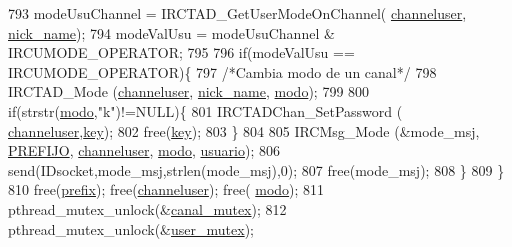 \begin{DoxyCode}
{{{{{{{{{{793                                 modeUsuChannel = IRCTAD\_GetUserModeOnChannel(
      \hyperlink{_g-2361-06-_p1-_server_8c_a55a7bd8f3229706c5917445aba995c5b}{channeluser}, \hyperlink{_g-2361-06-_p1-_server_8c_aabbf66718cda228b924a4a9441eadf62}{nick\_name});
794                                 modeValUsu = modeUsuChannel & IRCUMODE\_OPERATOR;
795 
796                                 \textcolor{keywordflow}{if}(modeValUsu == IRCUMODE\_OPERATOR)\{
797                                         \textcolor{comment}{/*Cambia modo de un canal*/}
798                                         IRCTAD\_Mode (\hyperlink{_g-2361-06-_p1-_server_8c_a55a7bd8f3229706c5917445aba995c5b}{channeluser}, 
      \hyperlink{_g-2361-06-_p1-_server_8c_aabbf66718cda228b924a4a9441eadf62}{nick\_name}, \hyperlink{_g-2361-06-_p1-_server_8c_a7451f0d59207b53af6178219fcf62677}{modo});
799 
800                                         \textcolor{keywordflow}{if}(strstr(\hyperlink{_g-2361-06-_p1-_server_8c_a7451f0d59207b53af6178219fcf62677}{modo},\textcolor{stringliteral}{"k"})!=NULL)\{
801                                                 IRCTADChan\_SetPassword (
      \hyperlink{_g-2361-06-_p1-_server_8c_a55a7bd8f3229706c5917445aba995c5b}{channeluser},\hyperlink{_g-2361-06-_p1-_server_8c_a5892a9181e6a332f84d27aecd41dcd12}{key});
802                                                 free(\hyperlink{_g-2361-06-_p1-_server_8c_a5892a9181e6a332f84d27aecd41dcd12}{key});
803                                         \}
804 
805                                         IRCMsg\_Mode (&mode\_msj, \hyperlink{_g-2361-06-_p1-_server_8h_a78c658ff923693099f7b621e7c351129}{PREFIJO}, 
      \hyperlink{_g-2361-06-_p1-_server_8c_a55a7bd8f3229706c5917445aba995c5b}{channeluser}, \hyperlink{_g-2361-06-_p1-_server_8c_a7451f0d59207b53af6178219fcf62677}{modo}, \hyperlink{_g-2361-06-_p1-_server_8c_a0147a5b81499984f9cb00379a8cb84af}{usuario});
806                                         send(IDsocket,mode\_msj,strlen(mode\_msj),0);
807                                         free(mode\_msj);
808                                 \}
809                         \}
810                         free(\hyperlink{_g-2361-06-_p1-_server_8c_ad2849cf781a4db22cc1b31eaaee50a4f}{prefix}); free(\hyperlink{_g-2361-06-_p1-_server_8c_a55a7bd8f3229706c5917445aba995c5b}{channeluser}); free(
      \hyperlink{_g-2361-06-_p1-_server_8c_a7451f0d59207b53af6178219fcf62677}{modo});
811                         pthread\_mutex\_unlock(&\hyperlink{_g-2361-06-_p1-_server_8c_ab86a544a49de18195048bac54dd3ac3e}{canal\_mutex});
812                         pthread\_mutex\_unlock(&\hyperlink{_g-2361-06-_p1-_server_8c_a5dedd07a1144d2ab70b74a8e64b6a7c0}{user\_mutex});
}}}}}}}}}}
\end{DoxyCode}
